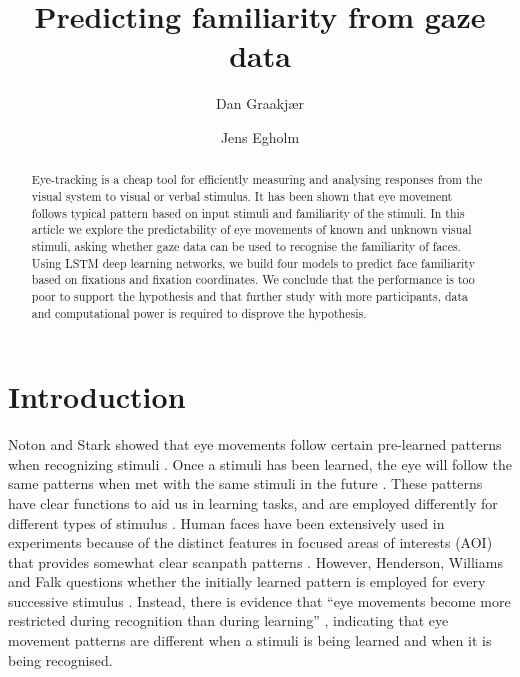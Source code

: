 \documentclass{llncs}
\begin{document}
\title{Predicting familiarity from gaze data}
%
%
\author{Dan Graakjær \and Jens Egholm}
%
%
%

\maketitle              %

\begin{abstract}
Eye-tracking is a cheap tool for efficiently measuring and analysing responses from
the visual system to visual or verbal stimulus. It has been shown that
eye movement follows typical pattern based on input stimuli and familiarity of the stimuli.
In this article we explore the predictability of eye movements of known and unknown visual stimuli,
asking whether gaze data can be used to recognise the familiarity of faces. Using LSTM deep learning
networks, we build four models to predict face familiarity based on fixations and fixation coordinates.
We conclude that the performance is too poor to support the hypothesis and that further study with more
participants, data and computational power is required to disprove the hypothesis.
\end{abstract}

\section{Introduction}
Noton and Stark showed that eye movements follow certain pre-learned patterns when recognizing stimuli \cite{noton1971}.
Once a stimuli has been learned, the eye will follow the same patterns when met with the same stimuli in the future \cite{noton1971, henderson2005}. These patterns have clear functions to aid us in learning tasks, and are employed differently for different types
of stimulus \cite{henderson2005}. Human faces have been extensively used in experiments because of the distinct features in focused 
areas of interests  (AOI) that provides somewhat clear scanpath patterns \cite{holmqvist2011,noton1971,henderson2005}.
However, Henderson, Williams and Falk questions whether the initially learned pattern is employed for every successive stimulus \cite{henderson2005}. Instead, there is
evidence that ``eye movements become more restricted during recognition than during learning'' \cite[p. 104]{henderson2005}, indicating that eye movement patterns are different when a stimuli is being learned and when it is being recognised.
\end{document}
